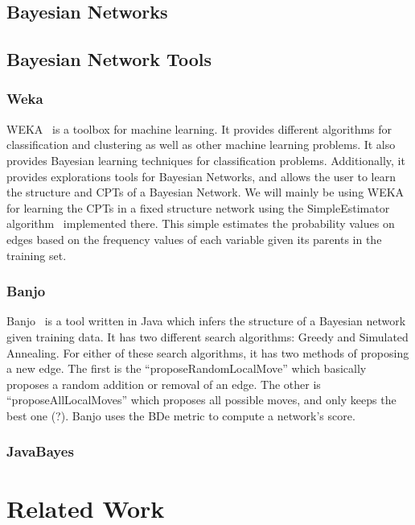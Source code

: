 \documentclass{article}
\begin{document}
\subsection{Bayesian Networks}

\subsection{Bayesian Network Tools}

\subsubsection{Weka}

WEKA~\cite{hall2009weka} is a toolbox for machine learning. It provides different algorithms for classification and clustering as well as other machine
learning problems. It also provides Bayesian learning techniques for classification problems. Additionally, it provides explorations tools for Bayesian
Networks, and allows the user to learn the structure and CPTs of a Bayesian Network. We will mainly be using WEKA for learning the CPTs in a fixed
structure network using the SimpleEstimator algorithm~\cite{written2005data} implemented there. This simple estimates the probability values on edges based on
the frequency values of each variable given its parents in the training set.

\subsubsection{Banjo}
Banjo~\cite{banjotool} is a tool written in Java which infers the structure of a Bayesian network given training data. It has two different search algorithms:
Greedy and Simulated Annealing. For either of these search algorithms, it has two methods of proposing a new edge. The first is the ``proposeRandomLocalMove''
which basically proposes a random addition or removal of an edge. The other is ``proposeAllLocalMoves'' which proposes all possible moves, and only keeps the
best one (?). Banjo uses the BDe metric to compute a network's score.

\subsubsection{JavaBayes}


\section{Related Work}
\label{rel-work}
\end{document}
